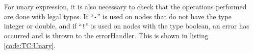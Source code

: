 For unary expression, it is also necessary to check that the operations performed are done with legal types. If “\texttt{-}” is used on nodes that do not have the type integer or double, and if “\texttt{!}” is used on nodes with the type boolean, an error has occurred and is thrown to the errorHandler. This is shown in listing \ref{code:TC:Unary}.\\

\noindent\newline